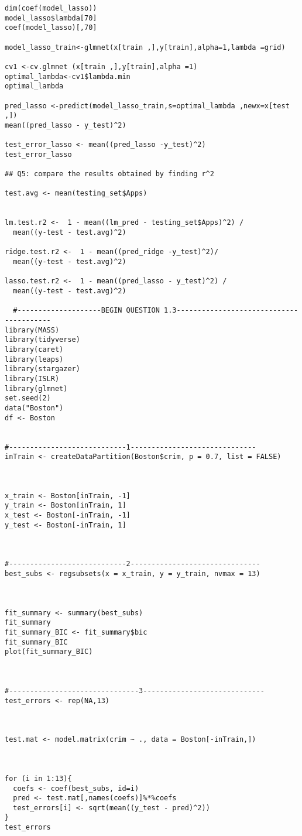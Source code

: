 \documentclass{article}
\begin{document}
\begin{verbatim}
dim(coef(model_lasso))
model_lasso$lambda[70]
coef(model_lasso)[,70]

model_lasso_train<-glmnet(x[train ,],y[train],alpha=1,lambda =grid)

cv1 <-cv.glmnet (x[train ,],y[train],alpha =1)
optimal_lambda<-cv1$lambda.min
optimal_lambda

pred_lasso <-predict(model_lasso_train,s=optimal_lambda ,newx=x[test ,])
mean((pred_lasso - y_test)^2)

test_error_lasso <- mean((pred_lasso -y_test)^2)
test_error_lasso

## Q5: compare the results obtained by finding r^2

test.avg <- mean(testing_set$Apps)


lm.test.r2 <-  1 - mean((lm_pred - testing_set$Apps)^2) /
  mean((y-test - test.avg)^2)

ridge.test.r2 <-  1 - mean((pred_ridge -y_test)^2)/
  mean((y-test - test.avg)^2)

lasso.test.r2 <-  1 - mean((pred_lasso - y_test)^2) /
  mean((y-test - test.avg)^2)
  
  #--------------------BEGIN QUESTION 1.3----------------------------------------
library(MASS)
library(tidyverse)
library(caret)
library(leaps)
library(stargazer)
library(ISLR)
library(glmnet)
set.seed(2)
data("Boston")
df <- Boston


#----------------------------1------------------------------
inTrain <- createDataPartition(Boston$crim, p = 0.7, list = FALSE)



x_train <- Boston[inTrain, -1]
y_train <- Boston[inTrain, 1]
x_test <- Boston[-inTrain, -1]
y_test <- Boston[-inTrain, 1]



#----------------------------2-------------------------------
best_subs <- regsubsets(x = x_train, y = y_train, nvmax = 13)



fit_summary <- summary(best_subs)
fit_summary
fit_summary_BIC <- fit_summary$bic
fit_summary_BIC
plot(fit_summary_BIC)



#-------------------------------3-----------------------------
test_errors <- rep(NA,13)



test.mat <- model.matrix(crim ~ ., data = Boston[-inTrain,])



for (i in 1:13){
  coefs <- coef(best_subs, id=i)
  pred <- test.mat[,names(coefs)]%*%coefs
  test_errors[i] <- sqrt(mean((y_test - pred)^2))
}
test_errors




\end{verbatim}
\end{document}
